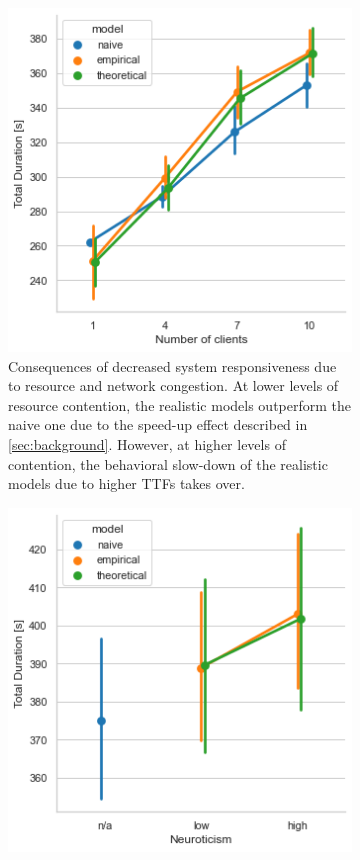 \begin{figure}
    \centering
    \begin{subfigure}[t]{\columnwidth}
        \centering
        \includegraphics[width=.8\textwidth]{figs/numclients_vs_duration.png}
        \caption{%
            Consequences of decreased system responsiveness due to resource and network congestion.
            At lower levels of resource contention, the realistic models outperform the naive one due to the speed-up effect described in \cref{sec:background}.
            However, at higher levels of contention, the behavioral slow-down of the realistic models due to higher \acp{TTF} takes over.
        }\label{fig:scaling_duration}
    \end{subfigure}%
    \hspace{\fill}%
    \begin{subfigure}[t]{\columnwidth}
        \centering
        \includegraphics[width=.8\textwidth]{figs/neuroticism_vs_duration.png}

\end{subfigure}
\end{figure}
